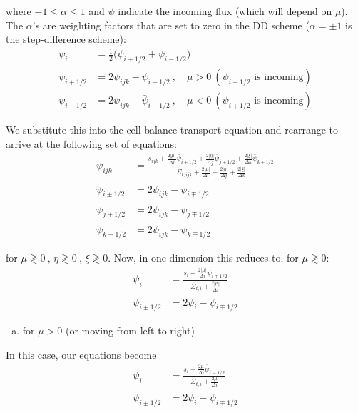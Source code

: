 \documentclass[10pt]{article}
\begin{document}
where $-1 \leq \alpha \leq 1$ and $\bar{\psi}$ indicate the incoming flux (which will depend on $\mu$). The $\alpha$'s are weighting factors that are set to zero in the DD scheme ($\alpha = \pm 1$ is the step-difference scheme):
%
\begin{align*}
\psi_{i} &= \frac{1}{2}\bigl(\psi_{i+1/2}+\psi_{i-1/2}\bigr)\\
\psi_{i+1/2} &= 2\psi_{ijk} - \bar{\psi}_{i-1/2}\:,\quad \mu>0\:(\psi_{i-1/2}\text{ is incoming})\\
\psi_{i-1/2} &= 2\psi_{ijk} - \bar{\psi}_{i+1/2}\:,\quad \mu<0 \:(\psi_{i+1/2}\text{ is incoming})
\end{align*}

We substitute this into the cell balance transport equation and rearrange to arrive at the following set of equations:
%
\begin{align*}
    \psi_{ijk} &= \frac{s_{ijk} +
      \frac{2|\mu|}{\Delta i}\bar{\psi}_{i\mp1/2} +
      \frac{2|\eta|}{\Delta j}\bar{\psi}_{j\mp1/2} +
      \frac{2|\xi|}{\Delta k}\bar{\psi}_{k\mp1/2}}{
      \Sigma_{t,ijk} + \frac{2|\mu|}{\Delta i} +
      \frac{2|\eta|}{\Delta j} +
      \frac{2|\xi|}{\Delta k} }\\
    \psi_{i\pm1/2} &= 2\psi_{ijk} - \bar{\psi}_{i\mp1/2}\\
    \psi_{j\pm1/2} &= 2\psi_{ijk} - \bar{\psi}_{j\mp1/2}\\
    \psi_{k\pm1/2} &= 2\psi_{ijk} - \bar{\psi}_{k\mp1/2}
\end{align*}

for $\mu\gtrless0\:,\,\eta\gtrless0\:,\,\xi\gtrless0$. Now, in one dimension this reduces to, for $\mu\gtrless0$:
%
\begin{align*}
    \psi_{i} &= \frac{s_{i} + \frac{2|\mu|}{\Delta i}\bar{\psi}_{i\mp1/2}}{\Sigma_{t,i} + \frac{2|\mu|}{\Delta i}} \\
    \psi_{i\pm1/2} &= 2\psi_{i} - \bar{\psi}_{i\mp1/2}
\end{align*}

%
%
%

\vspace{10pt}
\begin{enumerate}[(a)]
\item for $\mu > 0$ (or moving from left to right)
\end{enumerate}

In this case, our equations become
%
\begin{align*}
\psi_{i} &= \frac{s_{i} + \frac{2\mu}{\Delta i}\bar{\psi}_{i-1/2}}{\Sigma_{t,i} + \frac{2\mu}{\Delta i}} \\
\psi_{i\pm1/2} &= 2\psi_{i} - \bar{\psi}_{i\mp1/2}
\end{align*}
\end{document}
